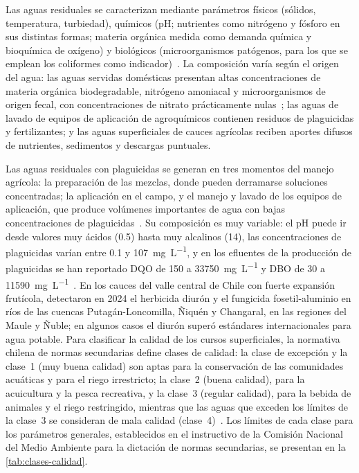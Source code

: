 Las aguas residuales se caracterizan mediante parámetros físicos (sólidos, temperatura, turbiedad), químicos (pH; nutrientes como nitrógeno y fósforo en sus distintas formas; materia orgánica medida como demanda química y bioquímica de oxígeno) y biológicos (microorganismos patógenos, para los que se emplean los coliformes como indicador)~\parencite{araya2014aguas,tchobanoglous2014wastewater}.
La composición varía según el origen del agua: las aguas servidas domésticas presentan altas concentraciones de materia orgánica biodegradable, nitrógeno amoniacal y microorganismos de origen fecal, con concentraciones de nitrato prácticamente nulas~\parencite{araya2014aguas}; las aguas de lavado de equipos de aplicación de agroquímicos contienen residuos de plaguicidas y fertilizantes; y las aguas superficiales de cauces agrícolas reciben aportes difusos de nutrientes, sedimentos y descargas puntuales.

Las aguas residuales con plaguicidas se generan en tres momentos del manejo agrícola: la preparación de las mezclas, donde pueden derramarse soluciones concentradas; la aplicación en el campo, y el manejo y lavado de los equipos de aplicación, que produce volúmenes importantes de agua con bajas concentraciones de plaguicidas~\parencite{mussali2023biobeds}.
Su composición es muy variable: el pH puede ir desde valores muy ácidos (\num{0.5}) hasta muy alcalinos (14), las concentraciones de plaguicidas varían entre \num{0.1} y \qty{107}{\milli\gram\per\liter}, y en los efluentes de la producción de plaguicidas se han reportado DQO de 150 a \qty{33750}{\milli\gram\per\liter} y DBO de 30 a \qty{11590}{\milli\gram\per\liter}~\parencite{saleh2020removal}.
En los cauces del valle central de Chile con fuerte expansión frutícola, \textcite{sigona2025pesticide} detectaron en 2024 el herbicida diurón y el fungicida fosetil-aluminio en ríos de las cuencas Putagán-Loncomilla, Ñiquén y Changaral, en las regiones del Maule y Ñuble; en algunos casos el diurón superó estándares internacionales para agua potable.
Para clasificar la calidad de los cursos superficiales, la normativa chilena de normas secundarias define clases de calidad: la clase de excepción y la clase~1 (muy buena calidad) son aptas para la conservación de las comunidades acuáticas y para el riego irrestricto; la clase~2 (buena calidad), para la acuicultura y la pesca recreativa, y la clase~3 (regular calidad), para la bebida de animales y el riego restringido, mientras que las aguas que exceden los límites de la clase~3 se consideran de mala calidad (clase~4)~\parencite{dga2003diagnostico}.
Los límites de cada clase para los parámetros generales, establecidos en el instructivo de la Comisión Nacional del Medio Ambiente para la dictación de normas secundarias, se presentan en la \cref{tab:clases-calidad}.

